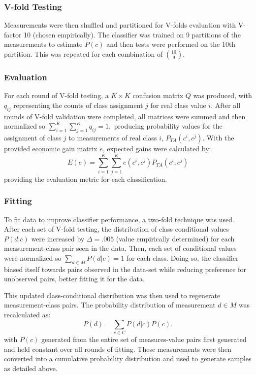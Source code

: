 \documentclass[10pt, conference]{IEEEtran}
\begin{document}
\subsubsection{V-fold Testing}
Measurements were then shuffled and partitioned for V-folds evaluation with V-factor 10 (chosen empirically).  The classifier was trained on 9 partitions of the measurements to estimate $P(c)$ and then tests were performed on the 10th partition. This was repeated for each combination of ${10 \choose 9}$.
\subsubsection{Evaluation}
For each round of V-fold testing, a $K \times K$ confusion matrix $Q$ was produced, with $q_{ij}$ representing the counts of class assignment $j$ for real class value $i$. After all rounds of V-fold validation were completed, all matrices were summed and then normalized so $\sum_{i=1}^K \sum_{j=1}^K q_{ij} = 1,$ producing probability values for the assignment of class $j$ to measurements of real class $i$, $P_{TA}(c^i, c^j).$  With the provided economic gain matrix $e$, expected gains were calculated by:
\begin{equation*}
E(e) =  \sum_{i=1}^K \sum_{j=1}^K e(c^i,c^j)P_{TA}(c^i, c^j)
\end{equation*}
providing the evaluation metric for each classification.
\subsubsection{Fitting}
To fit data to improve classifier performance, a two-fold technique was used. After each set of V-fold testing, the distribution of class conditional values $P(d|c)$ were increased by $\Delta=.005$ (value empirically determined) for each measurement-class pair seen in the data. Then, each set of conditional values were normalized so $\sum_{d \in M}P(d|c) =1$ for each class. Doing so, the classifier biased itself towards pairs observed in the data-set while reducing preference for unobserved pairs, better fitting it for the data.

This updated class-conditional distribution was then used to regenerate measurement-class pairs. The probability distribution of measurement $d \in M$ was recalculated as:
\begin{equation}
P(d) =  \sum_{c \in C}P(d|c)P(c). 
\end{equation}
with $P(c)$ generated from the entire set of measures-value pairs first generated and held constant over all rounds of fitting. These measurements were then converted into a cumulative probability distribution and used to generate samples as detailed above.
\end{document}
